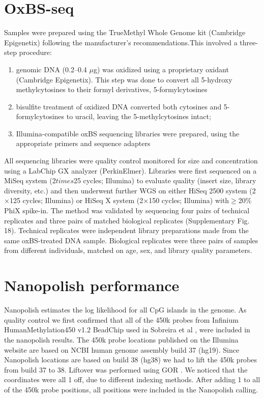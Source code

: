 \begin {table}
\begin{center}
\begin{tabular}{ l l l p{5cm}}
        \end{tabular}
    \label{table:cont}
    \end{center}
\end{table}

 \section{OxBS-seq}
 Samples were prepared using the TrueMethyl Whole Genome kit (Cambridge Epigenetix) following the manufacturer’s recommendations.This involved a three-step procedure:
 \begin{enumerate}
      \item genomic DNA (0.2–0.4 $\mu$g) was oxidized using a proprietary oxidant (Cambridge Epigenetix). This step was done to convert all 5-hydroxy methylcytosines to their formyl derivatives, 5-formylcytosines
    \item bisulfite treatment of oxidized DNA converted both cytosines and 5-formylcytosines to uracil, leaving the 5-methylcytosines intact; 
     \item Illumina-compatible oxBS sequencing libraries were prepared, using the appropriate primers and sequence adapters
 \end{enumerate}

All sequencing libraries were quality control monitored for size and concentration using a LabChip GX analyzer (PerkinElmer). Libraries were first sequenced on a MiSeq system (2$times$25 cycles; Illumina) to evaluate quality (insert size, library diversity, etc.) and then underwent further WGS on either HiSeq 2500 system (2$\times$125 cycles; Illumina) or HiSeq X system (2$\times$150 cycles; Illumina) with$\geq$20\% PhiX spike-in. The method was validated by sequencing four pairs of technical replicates and three pairs of matched biological replicates (Supplementary Fig. 18). Technical replicates were independent library preparations made from the same oxBS-treated DNA sample. Biological replicates were three pairs of samples from different individuals, matched on age, sex, and library quality parameters.

 \section{Nanopolish performance}
 \label{section:method:nanopolish-performance}
Nanopolish estimates the log likelihood for all CpG islands in the genome. As quality control we first confirmed that all of the 450k probes from Infinium HumanMethylation450 v1.2 BeadChip used in Sobreira et al  \cite{sobreira2017patients}, were included in the nanopolish results. The 450k probe locations published on the Illumina website \cite{illuminaweb} are based on NCBI human genome assembly build 37 (hg19). Since Nanopolish locations are based on build 38 (hg38) we had to lift the 450k probes from build 37 to 38. Liftover was performed using GOR \cite{gudhbjartsson2016gorpipe}. We noticed that the coordinates were all 1 off, due to different indexing methods. After adding 1 to all of the 450k probe positions, all positions were included in the Nanopolish calling.  

